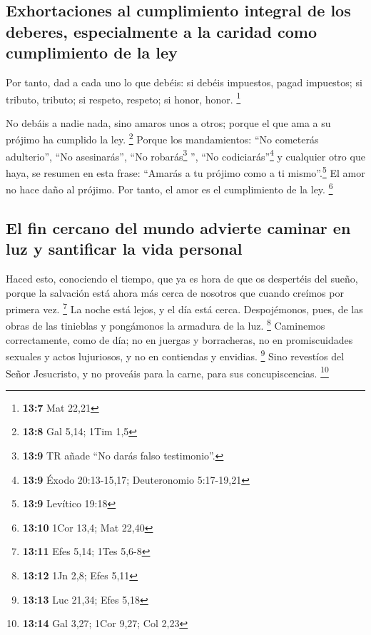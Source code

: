 \begin{paracol}{2}
\hypertarget{exhortaciones-al-cumplimiento-integral-de-los-deberes-especialmente-a-la-caridad-como-cumplimiento-de-la-ley}{%
\subsection{Exhortaciones al cumplimiento integral de los deberes,
especialmente a la caridad como cumplimiento de la
ley}\label{exhortaciones-al-cumplimiento-integral-de-los-deberes-especialmente-a-la-caridad-como-cumplimiento-de-la-ley}}

 Por tanto, dad a cada uno lo que debéis: si debéis
impuestos, pagad impuestos; si tributo, tributo; si respeto, respeto; si
honor, honor. \footnote{\textbf{13:7} Mat 22,21}

 No debáis a nadie nada, sino amaros unos a otros; porque
el que ama a su prójimo ha cumplido la ley. \footnote{\textbf{13:8} Gal
  5,14; 1Tim 1,5}  Porque los mandamientos: ``No cometerás
adulterio'', ``No asesinarás'', ``No robarás\footnote{\textbf{13:9} TR
  añade ``No darás falso testimonio''.} '', ``No codiciarás''\footnote{\textbf{13:9}
  Éxodo 20:13-15,17; Deuteronomio 5:17-19,21} y cualquier otro que haya,
se resumen en esta frase: ``Amarás a tu prójimo como a ti
mismo''.\footnote{\textbf{13:9} Levítico 19:18}  El amor
no hace daño al prójimo. Por tanto, el amor es el cumplimiento de la
ley. \footnote{\textbf{13:10} 1Cor 13,4; Mat 22,40}

\hypertarget{el-fin-cercano-del-mundo-advierte-caminar-en-luz-y-santificar-la-vida-personal}{%
\subsection{El fin cercano del mundo advierte caminar en luz y
santificar la vida
personal}\label{el-fin-cercano-del-mundo-advierte-caminar-en-luz-y-santificar-la-vida-personal}}

 Haced esto, conociendo el tiempo, que ya es hora de que
os despertéis del sueño, porque la salvación está ahora más cerca de
nosotros que cuando creímos por primera vez. \footnote{\textbf{13:11}
  Efes 5,14; 1Tes 5,6-8}  La noche está lejos, y el día
está cerca. Despojémonos, pues, de las obras de las tinieblas y
pongámonos la armadura de la luz. \footnote{\textbf{13:12} 1Jn 2,8; Efes
  5,11}  Caminemos correctamente, como de día; no en
juergas y borracheras, no en promiscuidades sexuales y actos lujuriosos,
y no en contiendas y envidias. \footnote{\textbf{13:13} Luc 21,34; Efes
  5,18}  Sino revestíos del Señor Jesucristo, y no
proveáis para la carne, para sus concupiscencias. \footnote{\textbf{13:14}
  Gal 3,27; 1Cor 9,27; Col 2,23}


\end{paracol}
